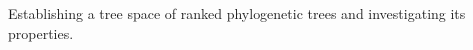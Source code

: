 \documentclass[10pt]{article} %
\newcommand{\email}[1]{{\href{mailto:#1}{#1}}}
\begin{document}
\begin{paracol}{2}
Establishing a tree space of ranked phylogenetic trees and investigating its properties.

\medskip %

\vspace{-\baselineskip}\medskip %









	




\end{paracol}
\end{document}
